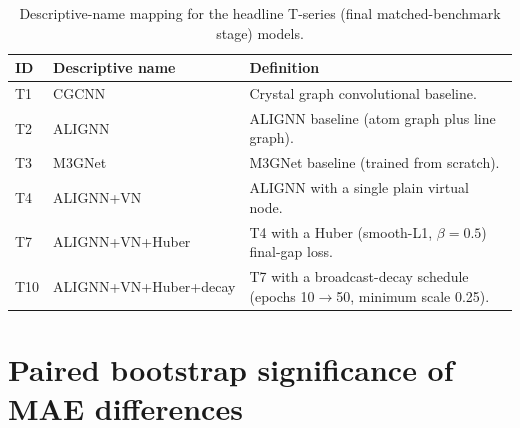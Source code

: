 \documentclass[a4paper,10pt]{article}
\begin{document}
\begin{table}[htbp]
\centering
\caption{Descriptive-name mapping for the headline T-series (final matched-benchmark stage) models.}
\label{tab:series-map}
\small
\begin{tabularx}{\textwidth}{l l Y}
\toprule
ID & Descriptive name & Definition \\
\midrule
T1 & CGCNN & Crystal graph convolutional baseline. \\
T2 & ALIGNN & ALIGNN baseline (atom graph plus line graph). \\
T3 & M3GNet & M3GNet baseline (trained from scratch). \\
T4 & ALIGNN+VN & ALIGNN with a single plain virtual node. \\
T7 & ALIGNN+VN+Huber & T4 with a Huber (smooth-L1, \(\beta=0.5\)) final-gap loss. \\
T10 & ALIGNN+VN+Huber+decay & T7 with a broadcast-decay schedule (epochs 10\(\to\)50, minimum scale 0.25). \\
\bottomrule
\end{tabularx}
\end{table}

\section{Paired bootstrap significance of MAE differences}
\end{document}
